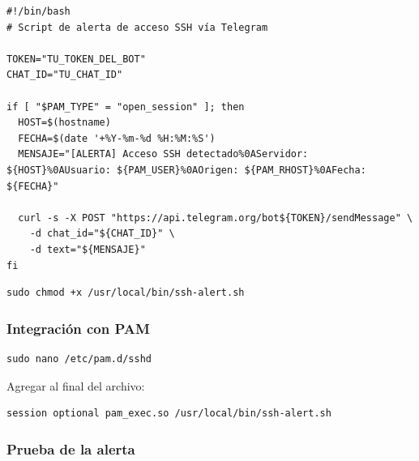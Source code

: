 \documentclass{article}
\renewcommand{\_}{\oldunderscore\hskip0pt\relax}
\begin{document}
\begin{Verbatim}[fontsize=\footnotesize,frame=single,rulecolor=\color{codebg},fillcolor=\color{codebg},framesep=2mm,xleftmargin=1mm,xrightmargin=1mm,breaklines=true,breakanywhere=true,breaksymbolleft={},breaksymbolright={}]
#!/bin/bash
# Script de alerta de acceso SSH vía Telegram

TOKEN="TU_TOKEN_DEL_BOT"
CHAT_ID="TU_CHAT_ID"

if [ "$PAM_TYPE" = "open_session" ]; then
  HOST=$(hostname)
  FECHA=$(date '+%Y-%m-%d %H:%M:%S')
  MENSAJE="[ALERTA] Acceso SSH detectado%0AServidor: ${HOST}%0AUsuario: ${PAM_USER}%0AOrigen: ${PAM_RHOST}%0AFecha: ${FECHA}"

  curl -s -X POST "https://api.telegram.org/bot${TOKEN}/sendMessage" \
    -d chat_id="${CHAT_ID}" \
    -d text="${MENSAJE}"
fi
\end{Verbatim}

\begin{Verbatim}[fontsize=\footnotesize,frame=single,rulecolor=\color{codebg},fillcolor=\color{codebg},framesep=2mm,xleftmargin=1mm,xrightmargin=1mm,breaklines=true,breakanywhere=true,breaksymbolleft={},breaksymbolright={}]
sudo chmod +x /usr/local/bin/ssh-alert.sh
\end{Verbatim}

\hypertarget{integraciuxf3n-con-pam}{%
\subsubsection{Integración con PAM}\label{integraciuxf3n-con-pam}}

\begin{Verbatim}[fontsize=\footnotesize,frame=single,rulecolor=\color{codebg},fillcolor=\color{codebg},framesep=2mm,xleftmargin=1mm,xrightmargin=1mm,breaklines=true,breakanywhere=true,breaksymbolleft={},breaksymbolright={}]
sudo nano /etc/pam.d/sshd
\end{Verbatim}

Agregar al final del archivo:

\begin{Verbatim}[fontsize=\footnotesize,frame=single,rulecolor=\color{codebg},fillcolor=\color{codebg},framesep=2mm,xleftmargin=1mm,xrightmargin=1mm,breaklines=true,breakanywhere=true,breaksymbolleft={},breaksymbolright={}]
session optional pam_exec.so /usr/local/bin/ssh-alert.sh
\end{Verbatim}

\hypertarget{prueba-de-la-alerta}{%
\subsubsection{Prueba de la alerta}\label{prueba-de-la-alerta}}
\end{document}
